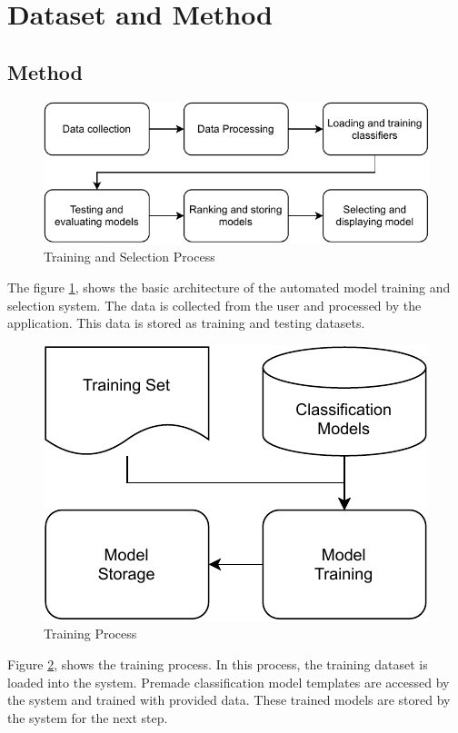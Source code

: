 \section{Dataset and Method} \label{sec:dataset_and_method}
\subsection{Method} \label{subsec:method}

\begin{figure}[ht]
    \centering
    \includegraphics[width=0.7\columnwidth]{media/design/Data_Flow_System.pdf}
    \caption{Training and Selection Process}
    \label{fig:data_flow_in_system}
\end{figure}

The figure \ref{fig:data_flow_in_system}, shows the basic architecture of the automated model training and selection system. The data is collected from the user and processed by the application. This data is stored as training and testing datasets.

\begin{figure}[ht]
    \centering
    \includegraphics[width=0.7\columnwidth]{media/design/Trainer.pdf}
    \caption{Training Process}
    \label{fig:training_process}
\end{figure}

Figure \ref{fig:training_process}, shows the training process. In this process, the training dataset is loaded into the system. Premade classification model templates are accessed by the system and trained with provided data. These trained models are stored by the system for the next step.

